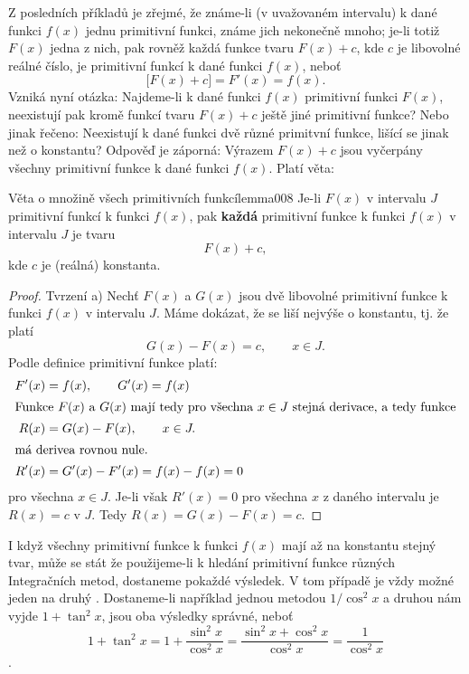       Z posledních příkladů je zřejmé, že známe-li (v uvažovaném intervalu) k dané funkci \(f(x)\)
      jednu primitivní funkci, známe jich nekonečně mnoho; je-li totiž \(F(x)\) jedna z nich, pak
      rovněž každá funkce tvaru \(F(x)+c\), kde \(c\) je libovolné reálné číslo, je primitivní
      funkcí k dané funkci \(f(x)\), neboť
      \begin{equation*}
        \bigl[F(x) + c\bigl] = F'(x) = f(x).
      \end{equation*}
      Vzniká nyní otázka: Najdeme-li k dané funkci \(f(x)\) primitivní funkci \(F(x)\), neexistují
      pak kromě funkcí tvaru \(F(x) + c\) ještě jiné primitivní funkce? Nebo jinak řečeno:
      Neexistují k dané funkci dvě různé primitvní funkce, lišící se jinak než o konstantu? Odpověď
      je záporná: Výrazem \(F(x) + c\) jsou vyčerpány všechny primitivní funkce k dané funkci
      \(f(x)\). Platí věta: 

      \begin{mathlemma}{Věta o množině všech primitivních funkcí}{lemma008}
        Je-li \(F(x)\) v intervalu \(J\) primitivní funkcí k funkci \(f(x)\), pak \textbf{každá}
        primitivní funkce k funkci \(f(x)\) v intervalu \(J\) je tvaru \[F(x) + c,\] kde \(c\) je
        (reálná) konstanta.
        \tcblower
        \begin{proof}
          Tvrzení a) Nechť \(F(x)\) a \(G(x)\) jsou dvě libovolné primitivní funkce k funkci
          \(f(x)\) v intervalu \(J\). Máme dokázat, že se liší nejvýše o konstantu, tj. že platí 
          \[G(x) - F(x) = c,  \qquad x\in J.\] Podle definice primitivní funkce platí:
          \begin{align*}
            F'(x) &= f(x), \qquad G'(x) = f(x)   \\
            \intertext{Funkce \(F(x)\) a \(G(x)\) mají tedy pro všechna \( x\in J\) stejná derivace, 
              a tedy funkce}
            R(x)  &= G(x) - F(x), \qquad x\in J.  \\
            \shortintertext{má derivea rovnou nule.}
            R'(x) &= G'(x) - F'(x) = f(x) - f(x) = 0
          \end{align*}
          pro všechna \( x\in J\). Je-li však \(R'(x)=0\) pro všechna \(x\) z daného intervalu je
          \(R(x)=c\) v \(J\). Tedy \(R(x) = G(x) - F(x)=c\).
        \end{proof}
      \end{mathlemma}

      I když všechny primitivní funkce k funkci \(f(x)\) mají až na konstantu stejný tvar, může se
      stát že použijeme-li k hledání primitivní funkce různých Integračních metod, dostaneme pokaždé
       výsledek. V tom případě je vždy možné  jeden na druhý
      \cite[p.~58]{rektorys2011}. Dostaneme-li například jednou metodou \(1/\cos^2x\) a druhou nám
      vyjde \(1+\tan^2x\), jsou oba výsledky správné, neboť \[1+\tan^2x = 1+\dfrac{\sin^2x}{\cos^2x}
      = \dfrac{\sin^2x + \cos^2x}{\cos^2x} = \dfrac{1}{\cos^2x}\].

